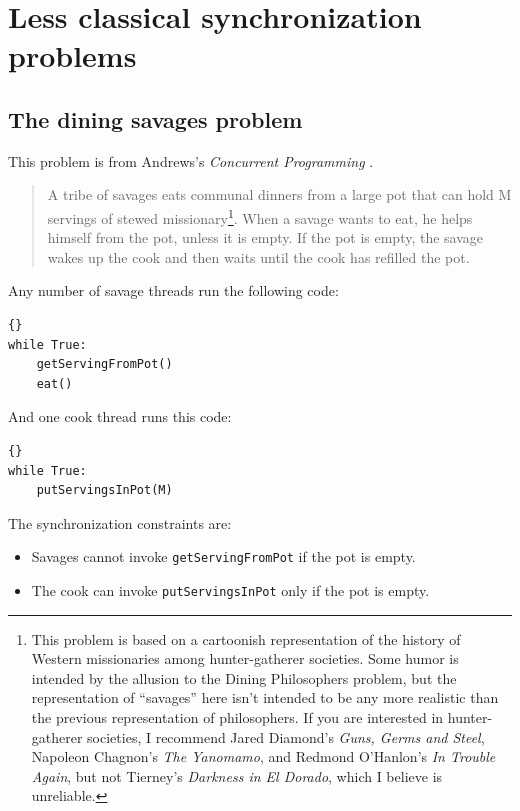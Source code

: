 \documentclass{book}
\newcommand{\clearemptydoublepage}{\newpage\cleardoublepage}
\begin{document}
\clearemptydoublepage
\chapter{Less classical synchronization problems}
\label{next}


\section{The dining savages problem}

This problem is from Andrews's 
{\em Concurrent Programming} \cite{andrews}.

\begin {quotation}
A tribe of savages eats communal dinners from a large pot that can
hold M servings of stewed missionary\footnote{This problem is based on
a cartoonish representation of the history of Western missionaries
among hunter-gatherer societies.  Some humor is intended by the
allusion to the Dining Philosophers problem, but the representation of
``savages'' here isn't intended to be any more realistic than the
previous representation of philosophers.  If you are interested in
hunter-gatherer societies, I recommend Jared Diamond's {\em Guns,
Germs and Steel}, Napoleon Chagnon's {\em The Yanomamo}, and Redmond
O'Hanlon's {\em In Trouble Again}, but not Tierney's {\em Darkness in
El Dorado}, which I believe is unreliable.}.  When a savage wants to
eat, he helps himself from the pot, unless it is empty.  If the pot is
empty, the savage wakes up the cook and then waits until the cook has
refilled the pot.
\end{quotation}

Any number of savage threads run the following code:

\begin{lstlisting}[caption={Unsynchronized savage code}]{}
while True:
    getServingFromPot()
    eat()
\end{lstlisting}

And one cook thread runs this code:

\begin{lstlisting}[caption={Unsynchronized cook code}]{}
while True:
    putServingsInPot(M)
\end{lstlisting}

The synchronization constraints are:

\begin{itemize}

\item Savages cannot invoke {\tt getServingFromPot} if the
pot is empty.

\item The cook can invoke {\tt putServingsInPot} only if
the pot is empty.

\end{itemize}
\end{document}
